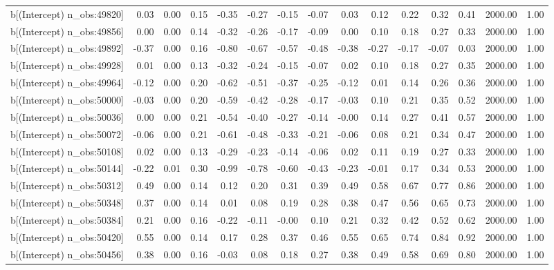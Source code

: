 \begin{table}[ht]
\begin{tabular}{rrrrrrrrrrrrrrr}
  b[(Intercept) n\_obs:49820] & 0.03 & 0.00 & 0.15 & -0.35 & -0.27 & -0.15 & -0.07 & 0.03 & 0.12 & 0.22 & 0.32 & 0.41 & 2000.00 & 1.00 \\ 
  b[(Intercept) n\_obs:49856] & 0.00 & 0.00 & 0.14 & -0.32 & -0.26 & -0.17 & -0.09 & 0.00 & 0.10 & 0.18 & 0.27 & 0.33 & 2000.00 & 1.00 \\ 
  b[(Intercept) n\_obs:49892] & -0.37 & 0.00 & 0.16 & -0.80 & -0.67 & -0.57 & -0.48 & -0.38 & -0.27 & -0.17 & -0.07 & 0.03 & 2000.00 & 1.00 \\ 
  b[(Intercept) n\_obs:49928] & 0.01 & 0.00 & 0.13 & -0.32 & -0.24 & -0.15 & -0.07 & 0.02 & 0.10 & 0.18 & 0.27 & 0.35 & 2000.00 & 1.00 \\ 
  b[(Intercept) n\_obs:49964] & -0.12 & 0.00 & 0.20 & -0.62 & -0.51 & -0.37 & -0.25 & -0.12 & 0.01 & 0.14 & 0.26 & 0.36 & 2000.00 & 1.00 \\ 
  b[(Intercept) n\_obs:50000] & -0.03 & 0.00 & 0.20 & -0.59 & -0.42 & -0.28 & -0.17 & -0.03 & 0.10 & 0.21 & 0.35 & 0.52 & 2000.00 & 1.00 \\ 
  b[(Intercept) n\_obs:50036] & 0.00 & 0.00 & 0.21 & -0.54 & -0.40 & -0.27 & -0.14 & -0.00 & 0.14 & 0.27 & 0.41 & 0.57 & 2000.00 & 1.00 \\ 
  b[(Intercept) n\_obs:50072] & -0.06 & 0.00 & 0.21 & -0.61 & -0.48 & -0.33 & -0.21 & -0.06 & 0.08 & 0.21 & 0.34 & 0.47 & 2000.00 & 1.00 \\ 
  b[(Intercept) n\_obs:50108] & 0.02 & 0.00 & 0.13 & -0.29 & -0.23 & -0.14 & -0.06 & 0.02 & 0.11 & 0.19 & 0.27 & 0.33 & 2000.00 & 1.00 \\ 
  b[(Intercept) n\_obs:50144] & -0.22 & 0.01 & 0.30 & -0.99 & -0.78 & -0.60 & -0.43 & -0.23 & -0.01 & 0.17 & 0.34 & 0.53 & 2000.00 & 1.00 \\ 
  b[(Intercept) n\_obs:50312] & 0.49 & 0.00 & 0.14 & 0.12 & 0.20 & 0.31 & 0.39 & 0.49 & 0.58 & 0.67 & 0.77 & 0.86 & 2000.00 & 1.00 \\ 
  b[(Intercept) n\_obs:50348] & 0.37 & 0.00 & 0.14 & 0.01 & 0.08 & 0.19 & 0.28 & 0.38 & 0.47 & 0.56 & 0.65 & 0.73 & 2000.00 & 1.00 \\ 
  b[(Intercept) n\_obs:50384] & 0.21 & 0.00 & 0.16 & -0.22 & -0.11 & -0.00 & 0.10 & 0.21 & 0.32 & 0.42 & 0.52 & 0.62 & 2000.00 & 1.00 \\ 
  b[(Intercept) n\_obs:50420] & 0.55 & 0.00 & 0.14 & 0.17 & 0.28 & 0.37 & 0.46 & 0.55 & 0.65 & 0.74 & 0.84 & 0.92 & 2000.00 & 1.00 \\ 
  b[(Intercept) n\_obs:50456] & 0.38 & 0.00 & 0.16 & -0.03 & 0.08 & 0.18 & 0.27 & 0.38 & 0.49 & 0.58 & 0.69 & 0.80 & 2000.00 & 1.00 \\ 

\end{tabular}
\end{table}
